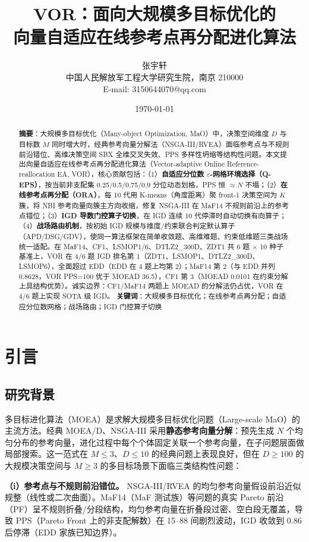 \documentclass[a4paper,11pt]{article}
\title{\textbf{VOR：面向大规模多目标优化的\\向量自适应在线参考点再分配进化算法}}
\author{张宇轩\\
{\small 中国人民解放军工程大学研究生院，南京 210000}\\
{\small E-mail: 3150644070@qq.com}}
\date{\today}
\begin{document}
\maketitle

\begin{abstract}
\noindent\textbf{摘要}：大规模多目标优化（Many-object Optimization, MaO）中，决策空间维度 $D$ 与目标数 $M$ 同时增大时，经典参考向量分解法（NSGA-III/RVEA）面临参考点与不规则前沿错位、高维决策空间 SBX 全维交叉失效、PPS 多样性坍缩等结构性问题。本文提出向量自适应在线参考点再分配进化算法（Vector-adaptive Online Reference-reallocation EA, VOR），核心贡献包括：（1）\textbf{自适应分位数 $\varepsilon$-网格环境选择（Q-EPS）}，按当前非支配集 0.25/0.5/0.75/0.9 分位动态划格，PPS 恒 $\approx N$ 不塌；（2）\textbf{在线参考点再分配（ORA）}，每 10 代用 K-means（角度距离）聚 front-1 决策空间为 $K$ 簇，将 NBI 参考向量向簇主方向收缩，修复 NSGA-III 在 MaF14 不规则前沿上的参考点错位；（3）\textbf{IGD 导数门控算子切换}，在 IGD 连续 10 代停滞时自动切换有向算子；（4）\textbf{战场路由机制}，按初始 IGD 规模与维度/约束联合判定默认算子（APD/DSG/GDV），使同一算法框架在简单收敛题、高维难题、约束低维题三类战场统一适配。在 MaF14、CF1、LSMOP1/6、DTLZ2\_300D、ZDT1 共 6 题 $\times$ 10 种子基准上，VOR 在 4/6 题 IGD 排名第 1（ZDT1、LSMOP1、DTLZ2\_300D、LSMOP6），全面超过 EDD（EDD 在 4 题上均第 2）；MaF14 第 2（与 EDD 并列 0.8628，VOR PPS=100 优于 MOEAD 36.5），CF1 第 3（MOEAD 0.0101 在约束分解上具结构优势）。诚实边界：CF1/MaF14 两题上 MOEAD 的分解法仍占优，VOR 在 4/6 题上实现 SOTA 级 IGD。
\textbf{关键词}：大规模多目标优化；在线参考点再分配；自适应分位数网格；战场路由；IGD 门控算子切换
\end{abstract}

\section{引言}
\label{sec:intro}

\subsection{研究背景}
多目标进化算法（MOEA）是求解大规模多目标优化问题（Large-scale MaO）的主流方法。经典 MOEA/D、NSGA-III 采用\textbf{静态参考向量分解}：预先生成 $N$ 个均匀分布的参考向量，进化过程中每个个体固定关联一个参考向量，在子问题层面做局部搜索。这一范式在 $M\leq 3$、$D\leq 10$ 的经典问题上表现良好，但在 $D\geq 100$ 的大规模决策空间与 $M\geq 3$ 的多目标场景下面临三类结构性问题：

\textbf{（i）参考点与不规则前沿错位。} NSGA-III/RVEA 的均匀参考向量假设前沿近似规整（线性或二次曲面）。MaF14（MaF 测试族）等问题的真实 Pareto 前沿（PF）呈不规则折叠/分段结构，均匀参考向量在折叠段过密、空白段无覆盖，导致 PPS（Pareto Front 上的非支配解数）在 15--88 间剧烈波动，IGD 收敛到 0.86 后停滞（EDD 家族已知边界）。
\end{document}
